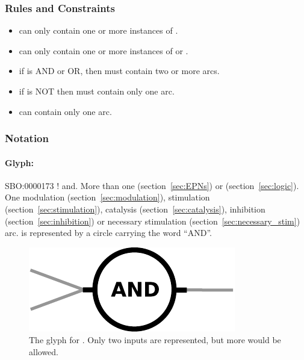 \subsubsection{Rules and Constraints}

\begin{itemize}
\item {} can only contain one or more instances of
  .
\item {} can only contain one or more instances of
   or .
\item if  is AND or OR, then  must
  contain two or more arcs.
\item if  is NOT then  must
  contain only one arc.
\item {} can contain only one arc.
\end{itemize}

\subsubsection{Notation}

\paragraph{Glyph: }\label{sec:and}

\begin{glyphDescription}
 \glyphSboTerm SBO:0000173 ! and.
 \glyphOrigin More than one  (section~\ref{sec:EPNs}) or  (section~\ref{sec:logic}).
 \glyphTarget  One modulation (section~\ref{sec:modulation}), stimulation (section~\ref{sec:stimulation}), catalysis (section~\ref{sec:catalysis}), inhibition (section~\ref{sec:inhibition}) or necessary stimulation (section~\ref{sec:necessary_stim}) arc.
 \glyphNode {} is represented by a circle carrying the word ``AND''.
\end{glyphDescription}

\begin{figure}[H]
  \centering
  \includegraphics[scale = 0.5]{images/and}
  \caption{The \PD glyph for . Only two inputs are represented, but more would be allowed.}
  \label{fig:and}
\end{figure}


